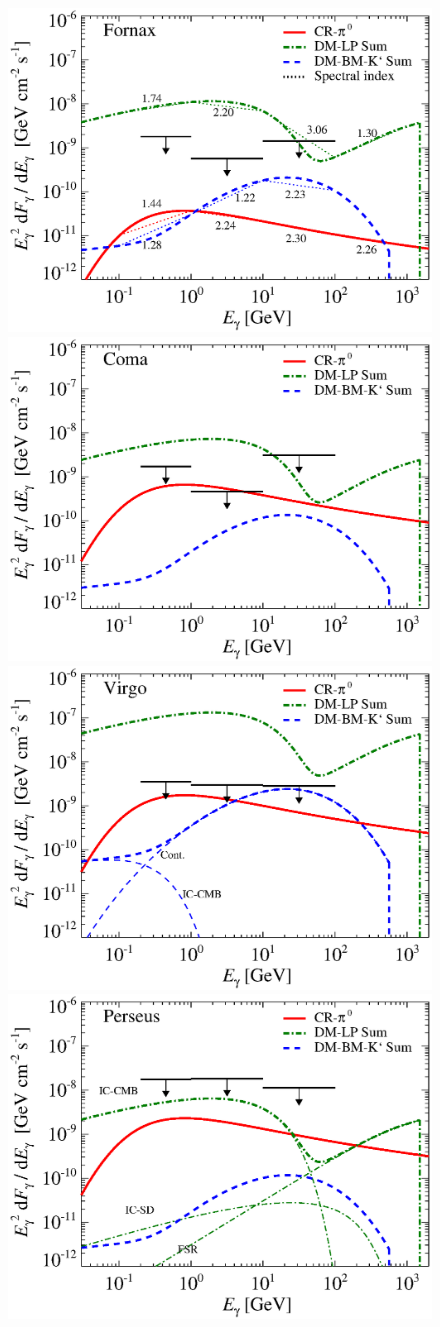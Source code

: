 \documentclass[10pt,aps,pra,reprint,amsmath,amsfonts,amssymb,showpacs,nofootinbib,floatfix]{revtex4-1}
\begin{document}
\begin{figure}
\begin{minipage}{2.0\columnwidth}
 \includegraphics[width=0.49\columnwidth]{figures/flux.cluster.Fornax.v13.0.1deg.1.6T.SubMass.SF700.IR2.noMW.woGal.eps}
\includegraphics[width=0.49\columnwidth]{figures/flux.cluster.Coma.v13.0.1deg.1.6T.SubMass.SF700.IR2.noMW.woGal.eps}
\includegraphics[width=0.49\columnwidth]{figures/flux.cluster.Virgo.v13.0.1deg.1.6T.SubMass.SF700.IR2.noMW.woGal.eps}
\includegraphics[width=0.49\columnwidth]{figures/flux.cluster.Perseus.v13.0.1deg.1.6T.SubMass.SF700.IR2.noMW.woGal.eps}

\end{minipage}
\end{figure}
\end{document}
